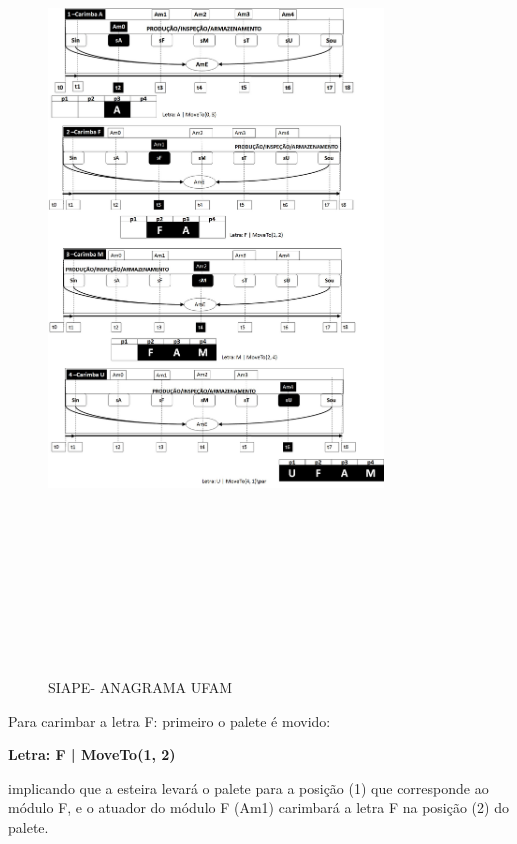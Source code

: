 \documentclass[10pt,letterpaper,twocolumn]{IEEEtran}
\begin{document}
					\begin{figure}[!h]
						\centering
						\includegraphics[width=8.9cm, height=22.5cm]{MeDSE_imagens/F123_PALAVRA_UFAM.jpg} 
						\caption{SIAPE- ANAGRAMA UFAM}
						\label{F123}
					\end{figure}
					
					Para carimbar a letra F:  primeiro o palete é movido:
					\begin{center}
						\textbf{Letra: F | MoveTo(1, 2)}
					\end{center}
					implicando que a esteira levará o palete para a posição (1) que corresponde ao módulo F, e o atuador do módulo F (Am1) carimbará a letra F na posição (2) do palete. 
					
\end{document}
